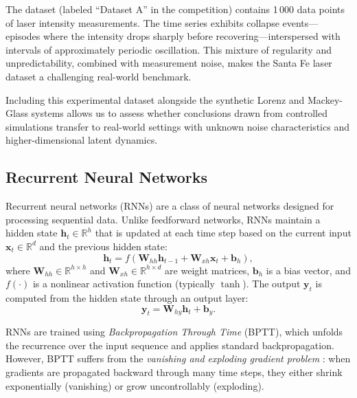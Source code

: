 The dataset (labeled ``Dataset A'' in the competition) contains 1\,000 data points of laser intensity measurements. The time series exhibits collapse events---episodes where the intensity drops sharply before recovering---interspersed with intervals of approximately periodic oscillation. This mixture of regularity and unpredictability, combined with measurement noise, makes the Santa Fe laser dataset a challenging real-world benchmark.

Including this experimental dataset alongside the synthetic Lorenz and Mackey-Glass systems allows us to assess whether conclusions drawn from controlled simulations transfer to real-world settings with unknown noise characteristics and higher-dimensional latent dynamics.

\subsection{Recurrent Neural Networks}
\label{sec:rnn}

Recurrent neural networks (RNNs) are a class of neural networks designed for processing sequential data. Unlike feedforward networks, RNNs maintain a hidden state $\mathbf{h}_t \in \mathbb{R}^h$ that is updated at each time step based on the current input $\mathbf{x}_t \in \mathbb{R}^d$ and the previous hidden state:
\begin{equation}
    \mathbf{h}_t = f(\mathbf{W}_{hh} \mathbf{h}_{t-1} + \mathbf{W}_{xh} \mathbf{x}_t + \mathbf{b}_h),
    \label{eq:rnn}
\end{equation}
where $\mathbf{W}_{hh} \in \mathbb{R}^{h \times h}$ and $\mathbf{W}_{xh} \in \mathbb{R}^{h \times d}$ are weight matrices, $\mathbf{b}_h$ is a bias vector, and $f(\cdot)$ is a nonlinear activation function (typically $\tanh$). The output $\mathbf{y}_t$ is computed from the hidden state through an output layer:
\begin{equation}
    \mathbf{y}_t = \mathbf{W}_{hy} \mathbf{h}_t + \mathbf{b}_y.
    \label{eq:rnn_output}
\end{equation}

RNNs are trained using \emph{Backpropagation Through Time} (BPTT), which unfolds the recurrence over the input sequence and applies standard backpropagation. However, BPTT suffers from the \emph{vanishing and exploding gradient problem} \cite{bengio1994learning, pascanu2013difficulty}: when gradients are propagated backward through many time steps, they either shrink exponentially (vanishing) or grow uncontrollably (exploding).

